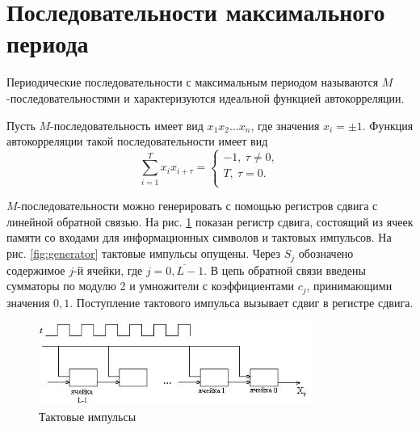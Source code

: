 ﻿\section{Последовательности максимального периода}
\label{section:max-seq}

Периодические последовательности с максимальным периодом называются $M$-последовательностями и характеризуются идеальной функцией автокорреляции.

Пусть $M$-последовательность имеет вид $x_1 x_2 \dots x_n$, где значения $x_{i} = \pm 1$. Функция автокорреляции такой последовательности имеет вид
\[
    \sum\limits_{i=1}^{T} x_i x_{i + \tau}  = \left\{ \begin{array}{l}
        -1, ~ \tau \neq 0, \\
        T, ~ \tau = 0. \\
    \end{array} \right.
\]

$M$-последовательности можно генерировать с помощью регистров сдвига с линейной обратной связью. На рис. \ref{fig:impulse} показан регистр сдвига, состоящий из ячеек памяти со входами для информационных символов и тактовых импульсов. На рис. \ref{fig:generator} тактовые импульсы опущены. Через $S_{j}$ обозначено содержимое $j$-й ячейки, где $j=\overline{0,L-1}$. В цепь обратной связи введены сумматоры по модулю 2 и умножители с коэффициентами $c_{j}$, принимающими значения $0,1$.  Поступление тактового импульса вызывает сдвиг в регистре сдвига.
\begin{figure}[h!]
	\centering
    \includegraphics[width=0.8\textwidth]{pic/taktovi-impuls}
    \caption{Тактовые импульсы\label{fig:impulse}}
\end{figure}


